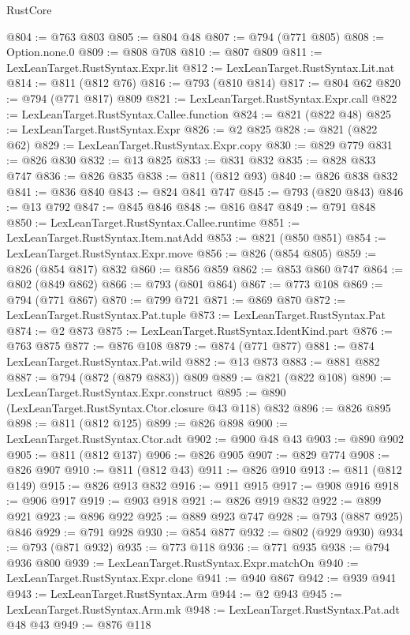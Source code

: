 \begin{lexlean}{RustCore}
\begin{coremodule}
@804 := @763 @803
@805 := @804 @48
@807 := @794 (@771 @805)
@808 := Option.none.{0}
@809 := @808 @708
@810 := @807 @809
@811 := LexLeanTarget.RustSyntax.Expr.lit
@812 := LexLeanTarget.RustSyntax.Lit.nat
@814 := @811 (@812 @76)
@816 := @793 (@810 @814)
@817 := @804 @62
@820 := @794 (@771 @817) @809
@821 := LexLeanTarget.RustSyntax.Expr.call
@822 := LexLeanTarget.RustSyntax.Callee.function
@824 := @821 (@822 @48)
@825 := LexLeanTarget.RustSyntax.Expr
@826 := @2 @825
@828 := @821 (@822 @62)
@829 := LexLeanTarget.RustSyntax.Expr.copy
@830 := @829 @779
@831 := @826 @830
@832 := @13 @825
@833 := @831 @832
@835 := @828 @833 @747
@836 := @826 @835
@838 := @811 (@812 @93)
@840 := @826 @838 @832
@841 := @836 @840
@843 := @824 @841 @747
@845 := @793 (@820 @843)
@846 := @13 @792
@847 := @845 @846
@848 := @816 @847
@849 := @791 @848
@850 := LexLeanTarget.RustSyntax.Callee.runtime
@851 := LexLeanTarget.RustSyntax.Item.natAdd
@853 := @821 (@850 @851)
@854 := LexLeanTarget.RustSyntax.Expr.move
@856 := @826 (@854 @805)
@859 := @826 (@854 @817) @832
@860 := @856 @859
@862 := @853 @860 @747
@864 := @802 (@849 @862)
@866 := @793 (@801 @864)
@867 := @773 @108
@869 := @794 (@771 @867)
@870 := @799 @721
@871 := @869 @870
@872 := LexLeanTarget.RustSyntax.Pat.tuple
@873 := LexLeanTarget.RustSyntax.Pat
@874 := @2 @873
@875 := LexLeanTarget.RustSyntax.IdentKind.part
@876 := @763 @875
@877 := @876 @108
@879 := @874 (@771 @877)
@881 := @874 LexLeanTarget.RustSyntax.Pat.wild
@882 := @13 @873
@883 := @881 @882
@887 := @794 (@872 (@879 @883)) @809
@889 := @821 (@822 @108)
@890 := LexLeanTarget.RustSyntax.Expr.construct
@895 := @890 (LexLeanTarget.RustSyntax.Ctor.closure @43 @118) @832
@896 := @826 @895
@898 := @811 (@812 @125)
@899 := @826 @898
@900 := LexLeanTarget.RustSyntax.Ctor.adt
@902 := @900 @48 @43
@903 := @890 @902
@905 := @811 (@812 @137)
@906 := @826 @905
@907 := @829 @774
@908 := @826 @907
@910 := @811 (@812 @43)
@911 := @826 @910
@913 := @811 (@812 @149)
@915 := @826 @913 @832
@916 := @911 @915
@917 := @908 @916
@918 := @906 @917
@919 := @903 @918
@921 := @826 @919 @832
@922 := @899 @921
@923 := @896 @922
@925 := @889 @923 @747
@928 := @793 (@887 @925) @846
@929 := @791 @928
@930 := @854 @877
@932 := @802 (@929 @930)
@934 := @793 (@871 @932)
@935 := @773 @118
@936 := @771 @935
@938 := @794 @936 @800
@939 := LexLeanTarget.RustSyntax.Expr.matchOn
@940 := LexLeanTarget.RustSyntax.Expr.clone
@941 := @940 @867
@942 := @939 @941
@943 := LexLeanTarget.RustSyntax.Arm
@944 := @2 @943
@945 := LexLeanTarget.RustSyntax.Arm.mk
@948 := LexLeanTarget.RustSyntax.Pat.adt @48 @43
@949 := @876 @118

\end{coremodule}
\end{lexlean}
